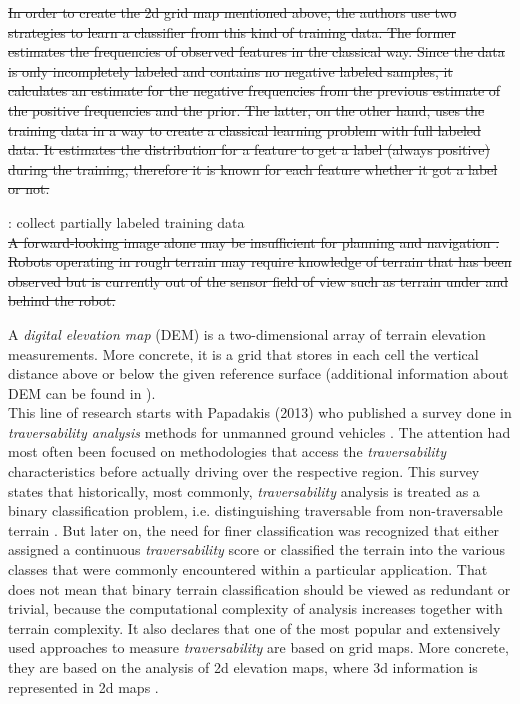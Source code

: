 \documentclass[12pt,a4paper]{report}
\newcommand{\term}{\textit}
\newcommand{\acronym}{\MakeUppercase}
\begin{document}
	
	\sout{In order to create the 2d grid map mentioned above, the authors use two 
	strategies to learn a classifier from this kind of 
	training data. The former estimates the frequencies of observed	features in the 
	classical way. Since the data is only incompletely labeled and contains no 
	negative labeled samples, it calculates an estimate for the negative 
	frequencies from the previous estimate of the positive frequencies and the prior. The 
	latter, on the other hand, uses the training data in a way to create a classical 
	learning problem with full labeled data. It estimates the distribution for a 
	feature to get a label (always positive) during the training, therefore it is 
	known for each feature whether it got a label or not.}
	
	\cite{Suger}: collect partially labeled training data
	\\
	
	\sout{A forward-looking image alone may be insufficient for planning and navigation
	\cite{Kweon}. Robots operating in rough terrain may require knowledge of 
	terrain that has been observed but is currently out of the sensor field of
	view such as terrain under and behind the robot.}
	
	A \term{digital elevation map} (\acronym{dem}) is a two-dimensional array of terrain 
	elevation measurements. More concrete, it is a grid that stores in each cell 
	the vertical distance above or below the given reference surface (additional
	information about \acronym{dem} can be found in \cite{Kweon}).
	\\
	
	This line of research starts with Papadakis (2013) who published a 
	survey done in \term{traversability analysis} methods for unmanned ground vehicles 
	\cite{Papadakis}. 
	The attention had most often been focused on methodologies that access the 
	\term{traversability} characteristics before actually driving over the respective 
	region.
	This survey states that historically, most commonly, \term{traversability} analysis is treated 
	as a binary classification problem, i.e. distinguishing traversable from 
	non-traversable terrain \cite{Suger, Hirose, Wigness}. 
	But later on, the need for finer classification was recognized that either assigned 
	a continuous \term{traversability} score or classified the terrain into the various classes 
	that were commonly encountered within a particular application.
	That does not mean that binary terrain classification should be viewed as redundant
	or trivial, because the computational complexity of analysis increases together 
	with terrain complexity.
	It also declares that one of the most popular and extensively used approaches 
	to measure \term{traversability} are based on grid 
	maps. More concrete, they are based on the analysis of 2d elevation maps, 
	where 3d information is represented in 2d maps \cite{Suger}.
	\\
	
\end{document}
